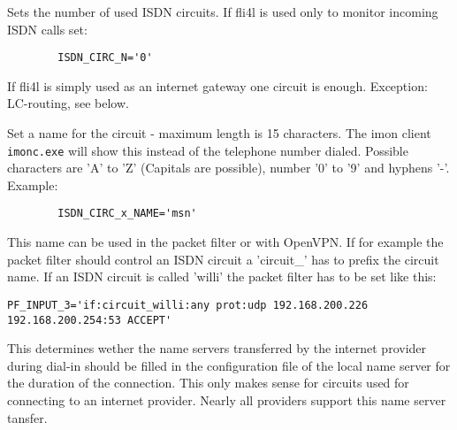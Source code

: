 \begin{description}

  
  Sets the number of used ISDN circuits. If fli4l is used only to monitor 
  incoming ISDN calls set:

\begin{example}
\begin{verbatim}
        ISDN_CIRC_N='0'
\end{verbatim}
\end{example}
  
  If fli4l is simply used as an internet gateway one circuit is enough. 
  Exception: LC-routing, see below.


  
  Set a name for the circuit - maximum length is 15 characters. 
  The imon client \texttt{imonc.exe} will show this instead of the 
  telephone number dialed. Possible characters are 'A' to 'Z' (Capitals 
  are possible), number '0' to '9' and hyphens '-'. Example:

\begin{example}
\begin{verbatim}
        ISDN_CIRC_x_NAME='msn'
\end{verbatim}
\end{example}

  This name can be used in the packet filter or with OpenVPN. If for example 
  the packet filter should control an ISDN circuit a 'circuit\_' has to prefix 
  the circuit name. If an ISDN circuit is called 'willi' the packet filter has 
  to be set like this:

\begin{example}
\begin{verbatim}
PF_INPUT_3='if:circuit_willi:any prot:udp 192.168.200.226 192.168.200.254:53 ACCEPT'
\end{verbatim}
\end{example}


  This determines wether the name servers transferred by the internet provider 
  during dial-in should be filled in the configuration file of the local name 
  server for the duration of the connection. This only makes sense for circuits 
  used for connecting to an internet provider. Nearly all providers support 
  this name server tansfer.
  

\end{description}
